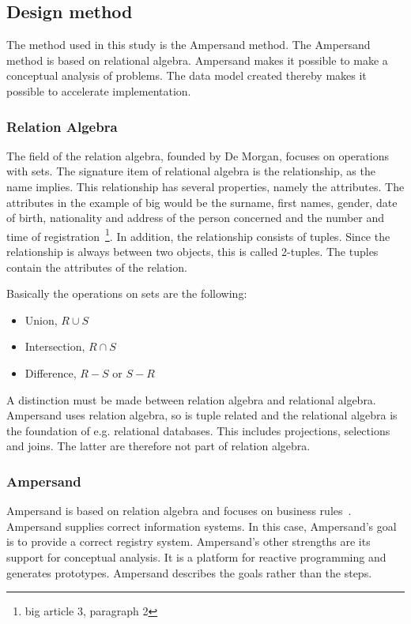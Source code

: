 \subsection{Design method} \label{design_method}
The method used in this study is the Ampersand method.
The Ampersand method is based on relational algebra.
Ampersand makes it possible to make a conceptual analysis of problems. The data model created thereby makes it possible to accelerate implementation.


\subsubsection{Relation Algebra} \label{relation_algebra}
The field of the relation algebra, founded by De Morgan, focuses on operations with sets.
The signature item of relational algebra is the relationship, as the name implies.
This relationship has several properties, namely the attributes.
The attributes in the example of \acrshort{big} would be the surname, first names, gender, date of birth, nationality and address of the person concerned and the number and time of registration~\footnote{\acrlong{big} article 3, paragraph 2}.
In addition, the relationship consists of tuples.
Since the relationship is always between two objects, this is called 2-tuples.
The tuples contain the attributes of the relation.

Basically the operations on sets are the following:
\begin{itemize}
    \item Union, $R \cup S$ %
    \item Intersection, $R \cap S$ %
    \item Difference, $R - S$ or $S - R$ %
\end{itemize}
A distinction must be made between relation algebra and relational algebra.
Ampersand uses relation algebra, so is tuple related and the relational algebra is the foundation of e.g. relational databases.
This includes projections, selections and joins.
The latter are therefore not part of relation algebra.


\subsubsection{Ampersand} \label{ampersand}
Ampersand is based on relation algebra and focuses on business rules~.
Ampersand supplies correct information systems.
In this case, Ampersand's goal is to provide a correct registry system.
Ampersand's other strengths are its support for conceptual analysis.
It is a platform for reactive programming and generates prototypes.
Ampersand describes the goals rather than the steps.

